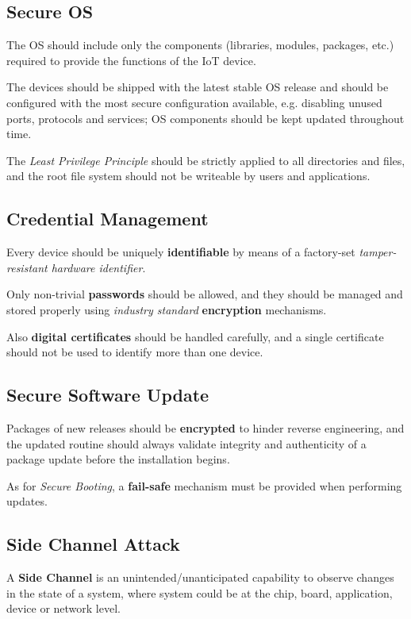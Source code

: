 
\subsection{Secure OS}
The OS should include only the components (libraries, modules, packages, etc.) required to provide the functions of the IoT device.

The devices should be shipped with the latest stable OS release and should be configured with the most secure configuration available, e.g. disabling unused ports, protocols and services;
OS components should be kept updated throughout time.

The \textit{Least Privilege Principle} should be strictly applied to all directories and files, and the root file system should not be writeable by users and applications.

\subsection{Credential Management}
Every device should be uniquely \textbf{identifiable} by means of a factory-set \textit{tamper-resistant hardware identifier}.

Only non-trivial \textbf{passwords} should be allowed, and they should be managed and stored properly using \textit{industry standard} \textbf{encryption} mechanisms.

Also \textbf{digital certificates} should be handled carefully, and a single certificate should not be used to identify more than one device.

\subsection{Secure Software Update}
Packages of new releases should be \textbf{encrypted} to hinder reverse engineering, and the
updated routine should always validate integrity and authenticity of a package update before the installation begins.

As for \textit{Secure Booting}, a \textbf{fail-safe} mechanism must be provided when performing updates.

\subsection{Side Channel Attack}
A \textbf{Side Channel} is an unintended/unanticipated capability to observe changes in the state
of a system, where system could be at the chip, board, application, device or network
level.

